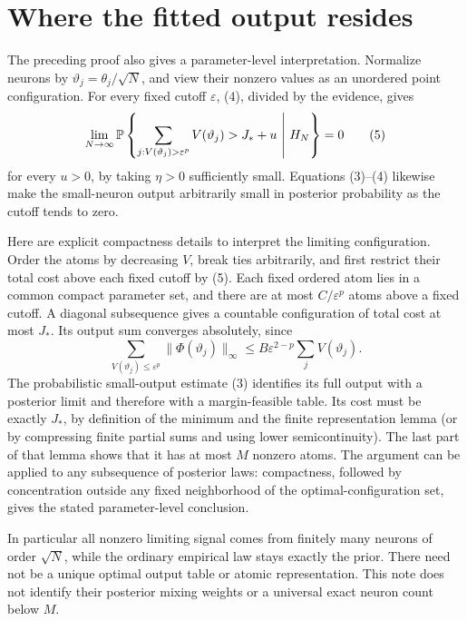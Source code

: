 \documentclass[11pt]{article}
\begin{document}
\section{Where the fitted output resides}
The preceding proof also gives a parameter-level interpretation.
Normalize neurons by $\vartheta_j=\theta_j/\sqrt N$, and view their
nonzero values as an unordered point configuration. For every fixed
cutoff $\varepsilon$, (4), divided by the evidence, gives
\[
 \lim_{N\to\infty}\Pp\left\{
 \sum_{j:V(\vartheta_j)>\varepsilon^p}V(\vartheta_j)>J_*+u
                      \ \middle|\ H_N\right\}=0          \tag{5}
\]
for every $u>0$, by taking $\eta>0$ sufficiently small.
Equations (3)--(4) likewise make the small-neuron output arbitrarily
small in posterior probability as the cutoff tends to zero.

Here are explicit compactness details to interpret the limiting
configuration. Order the atoms by decreasing $V$, break ties arbitrarily,
and first restrict their total cost above each fixed cutoff by (5).
Each fixed ordered atom lies in a common compact parameter set, and
there are at most $C/\varepsilon^p$ atoms above a fixed cutoff.
A diagonal subsequence gives a countable configuration of total cost
at most $J_*$. Its output sum converges absolutely, since
\[
 \sum_{V(\vartheta_j)\le\varepsilon^p}
       \|\Phi(\vartheta_j)\|_\infty
 \le B\varepsilon^{2-p}\sum_jV(\vartheta_j).
\]
The probabilistic small-output estimate (3) identifies its full output
with a posterior limit and therefore with a margin-feasible table.
Its cost must be exactly $J_*$, by definition of the minimum and the
finite representation lemma (or by compressing finite partial sums and
using lower semicontinuity). The last part of that lemma shows that
it has at most $M$ nonzero atoms. The argument can be applied to any
subsequence of posterior laws: compactness, followed by concentration
outside any fixed neighborhood of the optimal-configuration set, gives
the stated parameter-level conclusion.

In particular all nonzero limiting signal comes from finitely many
neurons of order $\sqrt N$, while the ordinary empirical law stays
exactly the prior. There need not be a unique optimal output table or
atomic representation. This note does not identify their posterior
mixing weights or a universal exact neuron count below $M$.
\end{document}
